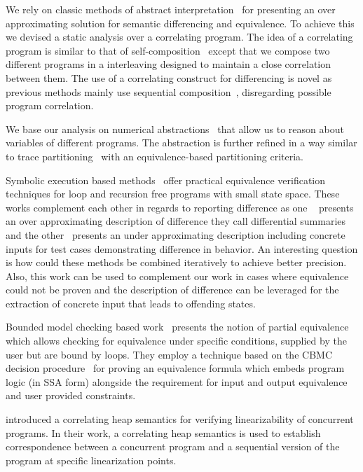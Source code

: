 We rely on classic methods of abstract interpretation~\cite{CousotCousot77} for presenting an over approximating solution for semantic differencing and equivalence. To achieve this we devised a static analysis over a correlating program. The idea of a correlating program is similar to that of self-composition~\cite{AikenTerauchi05} except that we compose two different programs in a interleaving designed to maintain a close correlation between them. The use of a correlating construct for differencing is novel as previous methods mainly use sequential composition~\cite{GodlinStrichman09, DwyerElbaumPerson08, EnglerRamos11}, disregarding possible program correlation.

We base our analysis on numerical abstractions~\cite{CousotHalbwachs78, Mine2006} that allow us to reason about variables of different programs. The abstraction is further refined in a way similar to trace partitioning~\cite{MauborgneRival07} with an equivalence-based partitioning criteria.

Symbolic execution based methods~\cite{DwyerElbaumPerson08, EnglerRamos11} offer practical equivalence verification techniques for loop and recursion free programs with small state space. These works complement each other in regards to reporting difference as one ~\cite{DwyerElbaumPerson08} presents an over approximating description of difference they call differential summaries and the other~\cite{EnglerRamos11} presents an under approximating description including concrete inputs for test cases demonstrating difference in behavior. An interesting question is how could these methods be combined iteratively to achieve better precision. Also, this work can be used to complement our work in cases where equivalence could not be proven and the description of difference can be leveraged for the extraction of concrete input that leads to offending states.

Bounded model checking based work~\cite{GodlinStrichman09} presents the notion of partial equivalence which allows checking for equivalence under specific conditions, supplied by the user but are bound by loops. They employ a technique based on the CBMC decision procedure~\cite{ClarkeKroeningYorav03} for proving an equivalence formula which embeds program logic (in SSA form) alongside the requirement for input and output equivalence and user provided constraints.

\cite{AmitRinetzkyRepsSagivYahav07} introduced a correlating heap semantics for verifying linearizability of concurrent programs. In their work, a correlating heap semantics is used to establish correspondence between a concurrent program and a sequential version of the program at specific linearization points.
